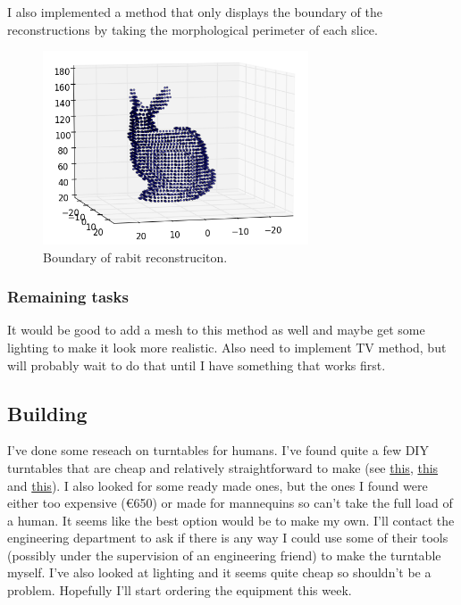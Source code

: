 \documentclass[a4paper]{article}
\begin{document}
I also implemented a method that only displays the boundary of the reconstructions by taking the morphological perimeter of each slice.

\begin{figure}[H]
  \centering
    \includegraphics[width=0.7\textwidth]{figures/rabit_ears_4.png}
    \caption{Boundary of rabit reconstruciton.}
  \label{fig:f2}
\end{figure}

\subsubsection{Remaining tasks}
It would be good to add a mesh to this method as well and maybe get some lighting to make it look more realistic.
Also need to implement TV method, but will probably wait to do that until I have something that works first.

\subsection{Building}
I've done some reseach on turntables for humans. I've found quite a few DIY turntables that are cheap and relatively straightforward to make (see \href{http://hackaday.com/2015/05/23/3d-scanning-rig-and-diy-turntable/}{this}, \href{http://www.thingiverse.com/thing:729923}{this} and \href{http://hackaday.com/2016/02/25/hacked-turntable-rotates-humans-for-3d-scanning/}{this}).
I also looked for some ready made ones, but the ones I found were either too expensive (€650) or made for mannequins so can't take the full load of a human.
It seems like the best option would be to make my own. I'll contact the engineering department to ask if there is any way I could use some of their tools (possibly under the supervision of an engineering friend) to make the turntable myself.
I've also looked at lighting and it seems quite cheap so shouldn't be a problem.
Hopefully I'll start ordering the equipment this week.
\end{document}
